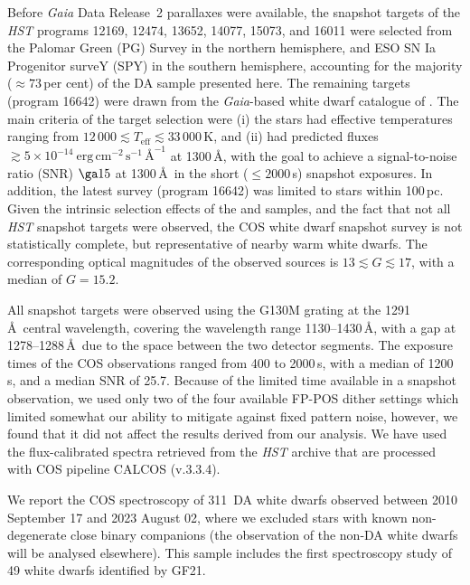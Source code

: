\documentclass[fleqn,usenatbib, useAMS]{mnras}
\newcommand{\Teff}{\mbox{$T_{\mathrm{eff}}$}}
\newcommand{\totalnumber}{311}
\begin{document}
Before \textit{Gaia} Data Release~2 parallaxes were available, the snapshot targets of the \textit{HST} programs 12169, 12474, 13652, 14077, 15073, and 16011 were selected from the Palomar Green (PG) Survey \citep{Liebert2005} in the northern hemisphere, and ESO SN Ia Progenitor surveY (SPY) \citep{Koester2009} in the southern hemisphere, accounting for the majority ($\approx73$\,per cent) of the DA sample presented here. The remaining targets (program 16642) were drawn from the \textit{Gaia}-based white dwarf catalogue of \citet[GF21, hereafter]{nicola2021}. The main criteria of the target selection were (i) the stars had effective temperatures ranging from $12\,000\lesssim\Teff\lesssim33\,000$\,K, and (ii) had predicted fluxes $\gtrsim5\times10^{-14}~\mathrm{erg\,cm^{-2}\,s^{-1}\,\mbox{\AA}^{-1}}$ at 1300\,\AA, with the goal to achieve a signal-to-noise ratio (SNR) $\ga15$ at 1300\,\AA\ in the short ($\le2000$\,s) snapshot exposures. In addition, the latest survey (program 16642) was limited to stars within 100\,pc. Given the intrinsic selection effects of the \cite{Liebert2005} and \cite{Koester2009} samples, and the fact that not all \textit{HST} snapshot targets were observed, the COS white dwarf snapshot survey is not statistically complete, but representative of nearby warm white dwarfs. The corresponding optical magnitudes of the  observed sources is $13\lesssim G\lesssim17$, with a median of $G=15.2$.

All snapshot targets were observed using the G130M grating at the 1291\,\AA\ central wavelength, covering the wavelength range 1130--1430\,\AA, with a gap at 1278--1288\,\AA\ due to the space between the two detector segments. The exposure times of the COS observations ranged from 400 to 2000\,s, with a median of 1200\,s, and a median SNR of 25.7. Because of the limited time available in a snapshot observation, we used only two of the four available FP-POS dither settings which limited somewhat our ability to mitigate against fixed pattern noise, however, we found that it did not affect the results derived from our analysis. We have used the flux-calibrated spectra retrieved from the \textit{HST} archive that are processed with COS pipeline CALCOS (v.3.3.4). 

We report the COS spectroscopy of \totalnumber\ DA white dwarfs observed between 2010 September 17 and 2023 August 02, where we excluded stars with known non-degenerate close binary companions (the observation of the non-DA white dwarfs will be analysed elsewhere). This sample includes the first spectroscopy study of 49 white dwarfs identified by GF21.
\end{document}
